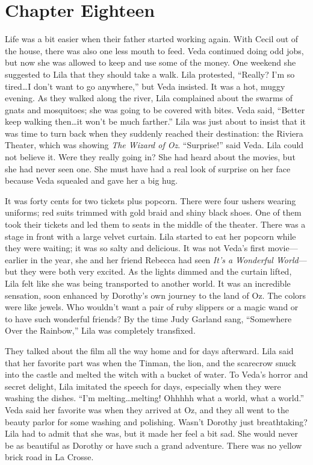 \documentclass[
  letterpaper,
]{book}
\begin{document}

\chapter{Chapter Eighteen}\label{chapter-eighteen}

Life was a bit easier when their father started working again. With
Cecil out of the house, there was also one less mouth to feed. Veda
continued doing odd jobs, but now she was allowed to keep and use some
of the money. One weekend she suggested to Lila that they should take a
walk. Lila protested, ``Really? I'm so tired\ldots I don't want to go
anywhere,'' but Veda insisted. It was a hot, muggy evening. As they
walked along the river, Lila complained about the swarms of gnats and
mosquitoes; she was going to be covered with bites. Veda said, ``Better
keep walking then\ldots it won't be much farther.'' Lila was just about
to insist that it was time to turn back when they suddenly reached their
destination: the Riviera Theater, which was showing \emph{The Wizard of
Oz}. ``Surprise!'' said Veda. Lila could not believe it. Were they
really going in? She had heard about the movies, but she had never seen
one. She must have had a real look of surprise on her face because Veda
squealed and gave her a big hug.

It was forty cents for two tickets plus popcorn. There were four ushers
wearing uniforms; red suits trimmed with gold braid and shiny black
shoes. One of them took their tickets and led them to seats in the
middle of the theater. There was a stage in front with a large velvet
curtain. Lila started to eat her popcorn while they were waiting; it was
so salty and delicious. It was not Veda's first movie---earlier in the
year, she and her friend Rebecca had seen \emph{It's a Wonderful
World}---but they were both very excited. As the lights dimmed and the
curtain lifted, Lila felt like she was being transported to another
world. It was an incredible sensation, soon enhanced by Dorothy's own
journey to the land of Oz. The colors were like jewels. Who wouldn't
want a pair of ruby slippers or a magic wand or to have such wonderful
friends? By the time Judy Garland sang, ``Somewhere Over the Rainbow,''
Lila was completely transfixed.

They talked about the film all the way home and for days afterward. Lila
said that her favorite part was when the Tinman, the lion, and the
scarecrow snuck into the castle and melted the witch with a bucket of
water. To Veda's horror and secret delight, Lila imitated the speech for
days, especially when they were washing the dishes. ``I'm
melting\ldots melting! Ohhhhh what a world, what a world.'' Veda said
her favorite was when they arrived at Oz, and they all went to the
beauty parlor for some washing and polishing. Wasn't Dorothy just
breathtaking? Lila had to admit that she was, but it made her feel a bit
sad. She would never be as beautiful as Dorothy or have such a grand
adventure. There was no yellow brick road in La Crosse.
\end{document}

